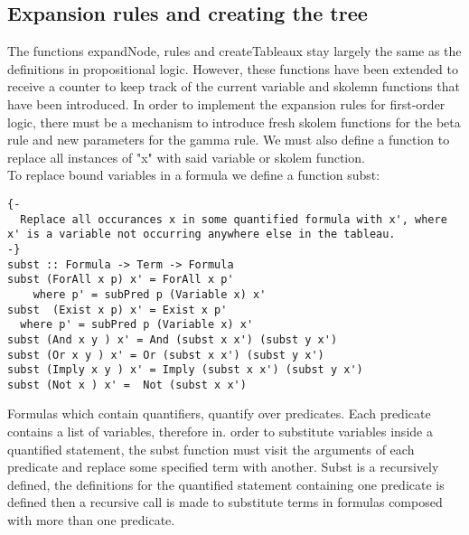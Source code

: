 \documentclass{article}%
\begin{document}
\subsection{Expansion rules and creating the tree}
The functions expandNode, rules and createTableaux stay largely the same as the definitions in propositional logic. However, these functions have been extended to receive a counter to keep track of the current variable and skolemn functions that have been introduced. In order to implement the expansion rules for first-order logic, there must be a mechanism to introduce fresh skolem functions for the beta rule and new parameters for the gamma rule. We must also define a function to replace all instances of "x" with said variable or skolem function. \\
To replace bound variables in a formula we define a function subst:
\begin{verbatim}
{-
  Replace all occurances x in some quantified formula with x', where x' is a variable not occurring anywhere else in the tableau.
-}
subst :: Formula -> Term -> Formula 
subst (ForAll x p) x' = ForAll x p'
    where p' = subPred p (Variable x) x'
subst  (Exist x p) x' = Exist x p'
  where p' = subPred p (Variable x) x'
subst (And x y ) x' = And (subst x x') (subst y x')
subst (Or x y ) x' = Or (subst x x') (subst y x')
subst (Imply x y ) x' = Imply (subst x x') (subst y x')
subst (Not x ) x' =  Not (subst x x') 
\end{verbatim}
Formulas which contain quantifiers, quantify over predicates. Each predicate contains a list of variables, therefore in. order to substitute variables inside a quantified statement, the subst function must visit the arguments of each predicate and replace some specified term with another. Subst is a recursively defined, the definitions for the quantified statement containing one predicate is defined then a recursive call is made to substitute terms in formulas composed with more than one predicate. 
\end{document}
